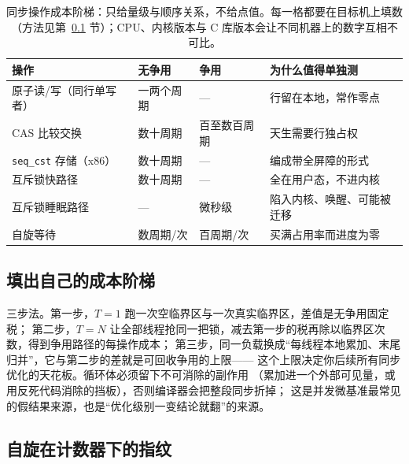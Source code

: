 \documentclass[12pt,a4paper,fontset=fandol]{ctexbook}
\newcommand{\Tp}[1]{\texttt{#1}}
\begin{document}
\begin{table}[htbp]
\centering
\small
\begin{tabular}{>{\raggedright\arraybackslash}p{}
                >{\raggedright\arraybackslash}p{}
                >{\raggedright\arraybackslash}p{}
                >{\raggedright\arraybackslash}p{}}
\toprule
操作 & 无争用 & 争用 & 为什么值得单独测 \\
\midrule
原子读/写（同行单写者） & 一两个周期 & --- & 行留在本地，常作零点 \\
CAS 比较交换 & 数十周期 & 百至数百周期 & 天生需要行独占权 \\
\Tp{seq\_cst} 存储（x86） & 数十周期 & --- & 编成带全屏障的形式 \\
互斥锁快路径 & 数十周期 & --- & 全在用户态，不进内核 \\
互斥锁睡眠路径 & --- & 微秒级 & 陷入内核、唤醒、可能被迁移 \\
自旋等待 & 数周期/次 & 百周期/次 & 买满占用率而进度为零 \\
\bottomrule
\end{tabular}
\caption{同步操作成本阶梯：只给量级与顺序关系，不给点值。每一格都要在目标机上填数
（方法见第~\ref{sub:pm09-ladder} 节）；CPU、内核版本与 C 库版本会让不同机器上的数字互相不可比。}
\label{tab:pm09-ladder}
\end{table}

\subsection{填出自己的成本阶梯}
\label{sub:pm09-ladder}

三步法。第一步，$T=1$ 跑一次空临界区与一次真实临界区，差值是无争用固定税；
第二步，$T=N$ 让全部线程抢同一把锁，减去第一步的税再除以临界区次数，得到争用路径的每操作成本；
第三步，同一负载换成``每线程本地累加、末尾归并''，它与第二步的差就是可回收争用的上限——
这个上限决定你后续所有同步优化的天花板。循环体必须留下不可消除的副作用
（累加进一个外部可见量，或用反死代码消除的挡板），否则编译器会把整段同步折掉；
这是并发微基准最常见的假结果来源，也是``优化级别一变结论就翻''的来源。

\subsection{自旋在计数器下的指纹}
\end{document}
